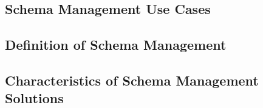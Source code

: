 \subsection{Schema Management Use Cases}

\subsection{Definition of Schema Management}

\subsection{Characteristics of Schema Management Solutions}
